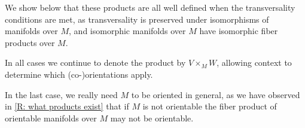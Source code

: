 \begin{definition}
	We show below that these products are all well defined when the transversality conditions are met, as transversality is preserved under isomorphisms of manifolds over $M$, and isomorphic manifolds over $M$ have isomorphic fiber products over $M$.

	In all cases we continue to denote the product by $V \times_M W$, allowing context to determine which (co\nobreakdash-)orientations apply.
\end{definition}



In the last case, we really need $M$ to be oriented in general, as we have observed in \cref{R: what products exist} that if $M$ is not orientable the fiber product of orientable manifolds over $M$ may not be orientable.

\begin{comment}
	In the cases where $r_V$ and $r_W$ are transverse embeddings, these products are represented by just taking intersections, with the orientations or co-orientations given explicitly in \cref{P: normal pullback,P: cap of immersions,P: orient intersection}.
	If $r_V$ and $r_W$ are immersions, these descriptions hold locally.
\end{comment}

